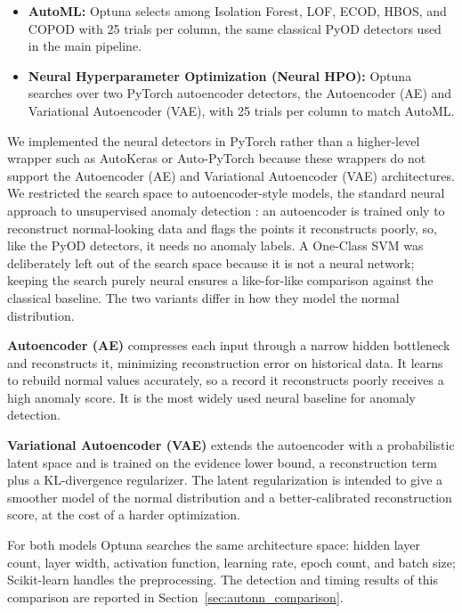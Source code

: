 \documentclass[12pt]{article}
\begin{document}
\begin{itemize}
  \item \textbf{AutoML:} Optuna selects among Isolation Forest, LOF, ECOD, HBOS, and COPOD with 25 trials per column, the same classical PyOD detectors used in the main pipeline.
  \item \textbf{Neural Hyperparameter Optimization (Neural HPO):} Optuna searches over two PyTorch autoencoder detectors, the Autoencoder (AE) and Variational Autoencoder (VAE), with 25 trials per column to match AutoML.
\end{itemize}

We implemented the neural detectors in PyTorch rather than a higher-level wrapper such as AutoKeras or Auto-PyTorch because these wrappers do not support the Autoencoder (AE) and Variational Autoencoder (VAE) architectures. We restricted the search space to autoencoder-style models, the standard neural approach to unsupervised anomaly detection \cite{pang2022deeplearning}: an autoencoder is trained only to reconstruct normal-looking data and flags the points it reconstructs poorly, so, like the PyOD detectors, it needs no anomaly labels. A One-Class SVM was deliberately left out of the search space because it is not a neural network; keeping the search purely neural ensures a like-for-like comparison against the classical baseline. The two variants differ in how they model the normal distribution.

\textbf{Autoencoder (AE)} compresses each input through a narrow hidden bottleneck and reconstructs it, minimizing reconstruction error on historical data. It learns to rebuild normal values accurately, so a record it reconstructs poorly receives a high anomaly score. It is the most widely used neural baseline for anomaly detection.

\textbf{Variational Autoencoder (VAE)} extends the autoencoder with a probabilistic latent space and is trained on the evidence lower bound, a reconstruction term plus a KL-divergence regularizer. The latent regularization is intended to give a smoother model of the normal distribution and a better-calibrated reconstruction score, at the cost of a harder optimization.

For both models Optuna searches the same architecture space: hidden layer count, layer width, activation function, learning rate, epoch count, and batch size; Scikit-learn handles the preprocessing. The detection and timing results of this comparison are reported in Section~\ref{sec:autonn_comparison}.
\end{document}
